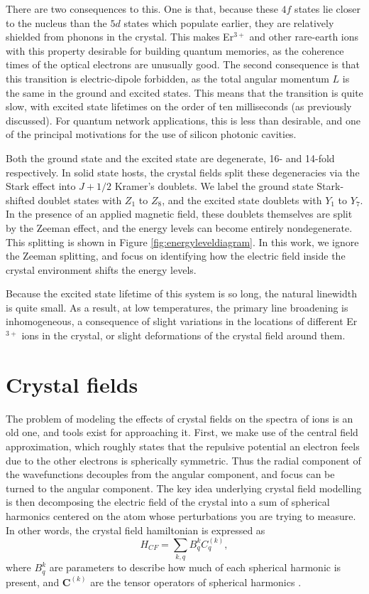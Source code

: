 \documentclass[12pt]{puthesis}
\newcommand{\erbium}[1][ ]{Er$^{3+}$#1}
\begin{document}
There are two consequences to this. One is that, because these $4f$ states lie closer to the nucleus than the $5d$ states which populate earlier, they are relatively shielded from phonons in the crystal. This makes \erbium and other rare-earth ions with this property desirable for building quantum memories, as the coherence times of the optical electrons are unusually good. The second consequence is that this transition is electric-dipole forbidden, as the total angular momentum $L$ is the same in the ground and excited states. This means that the transition is quite slow, with excited state lifetimes on the order of ten milliseconds (as previously discussed). For quantum network applications, this is less than desirable, and one of the principal motivations for the use of silicon photonic cavities. 

Both the ground state and the excited state are degenerate, 16- and 14-fold respectively. In solid state hosts, the crystal fields split these degeneracies via the Stark effect into $J+1/2$ Kramer's doublets. We label the ground state Stark-shifted doublet states with $Z_{1}$ to $Z_{8}$, and the excited state doublets with $Y_{1}$ to $Y_{7}$. In the presence of an applied magnetic field, these doublets themselves are split by the Zeeman effect, and the energy levels can become entirely nondegenerate. This splitting is shown in Figure \ref{fig:energyleveldiagram}. In this work, we ignore the Zeeman splitting, and focus on identifying how the electric field inside the crystal environment shifts the energy levels. 

Because the excited state lifetime of this system is so long, the natural linewidth is quite small. As a result, at low temperatures, the primary line broadening is inhomogeneous, a consequence of slight variations in the locations of different \erbium ions in the crystal, or slight deformations of the crystal field around them.


\section{Crystal fields}
\label{sec:crystal-fields}

The problem of modeling the effects of crystal fields on the spectra of ions is an old one, and tools exist for approaching it. First, we make use of the central field approximation, which roughly states that the repulsive potential an electron feels due to the other electrons is spherically symmetric. Thus the radial component of the wavefunctions decouples from the angular component, and focus can be turned to the angular component. The key idea underlying crystal field modelling is then decomposing the electric field of the crystal into a sum of spherical harmonics centered on the atom whose perturbations you are trying to measure. In other words, the crystal field hamiltonian is expressed as 
\begin{equation}\label{eq:3}
  H_{CF} = \sum_{k, q}B_{q}^{k}C_{q}^{(k)},
\end{equation}
where $B_{q}^{k}$ are parameters to describe how much of each spherical harmonic is present, and $\mathbf{C}^{(k)}$ are the tensor operators of spherical harmonics \cite{Liu2006}.
\end{document}
